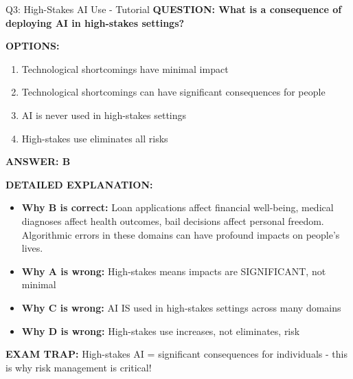 \documentclass[8pt]{beamer}
\begin{document}
	\begin{frame}{Q3: High-Stakes AI Use - Tutorial}
		\fontsize{6.5}{7.5}\selectfont
		\textbf{QUESTION: What is a consequence of deploying AI in high-stakes settings?}
		
		\vspace{0.1cm}
		\textbf{OPTIONS:}
		\begin{enumerate}
			\item Technological shortcomings have minimal impact
			\item Technological shortcomings can have significant consequences for people
			\item AI is never used in high-stakes settings
			\item High-stakes use eliminates all risks
		\end{enumerate}
		
		\vspace{0.1cm}
		\textcolor{myblue}{\textbf{ANSWER: B}}
		
		\vspace{0.1cm}
		\textbf{DETAILED EXPLANATION:}
		\begin{itemize}
			\item \textbf{Why B is correct:} Loan applications affect financial well-being, medical diagnoses affect health outcomes, bail decisions affect personal freedom. Algorithmic errors in these domains can have profound impacts on people's lives.
			\item \textbf{Why A is wrong:} High-stakes means impacts are SIGNIFICANT, not minimal
			\item \textbf{Why C is wrong:} AI IS used in high-stakes settings across many domains
			\item \textbf{Why D is wrong:} High-stakes use increases, not eliminates, risk
		\end{itemize}
		
		\textcolor{myred}{\textbf{EXAM TRAP:}} High-stakes AI = \textcolor{myblue}{significant consequences} for individuals - this is why risk management is critical!
	\end{frame}
	
\end{document}
